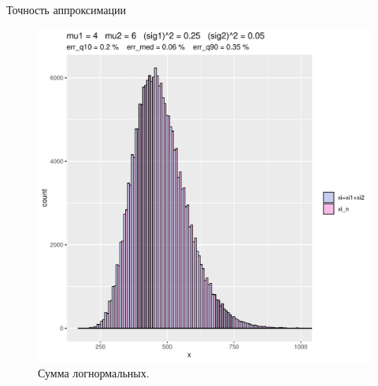 \documentclass[ucs, notheorems, handout]{beamer}
\begin{document}
\begin{frame}{Точность аппроксимации }
	
	\begin{figure}[h]
		\begin{center}
			\begin{minipage}[h]{0.8\linewidth}
				\includegraphics[width=1\linewidth]{hist_new_3.pdf}
				\caption{Сумма логнормальных.} %
				\label{ris7} %
			\end{minipage}
			
		\end{center}
	\end{figure}	
	
\end{frame}
\end{document}
